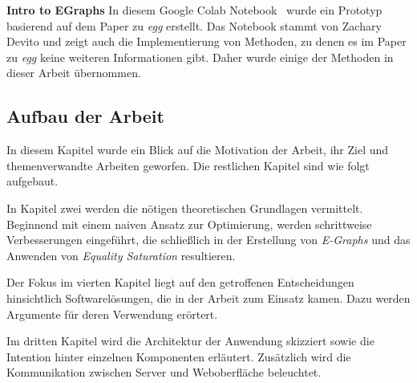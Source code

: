 \noindent\textbf{Intro to EGraphs} In diesem Google Colab Notebook~\cite{devito} wurde ein Prototyp basierend auf dem Paper zu \textit{egg} erstellt.
Das Notebook stammt von Zachary Devito und zeigt auch die Implementierung von Methoden, zu denen es im Paper zu \textit{egg} keine weiteren Informationen gibt. 
Daher wurde einige der Methoden in dieser Arbeit übernommen.

\subsection{Aufbau der Arbeit}

In diesem Kapitel wurde ein Blick auf die Motivation der Arbeit, ihr Ziel und themenverwandte Arbeiten geworfen. Die restlichen Kapitel sind wie folgt aufgebaut.

\vspace{-2mm}

In Kapitel zwei werden die nötigen theoretischen Grundlagen vermittelt. Beginnend mit einem naiven Ansatz zur Optimierung, werden schrittweise Verbesserungen
eingeführt, die schließlich in der Erstellung von \textit{E-Graphs} und das Anwenden von \textit{Equality Saturation} resultieren. 

\vspace{6mm}

\vspace{-2mm}

Der Fokus im vierten Kapitel liegt auf den getroffenen Entscheidungen hinsichtlich Softwarelösungen, die in der Arbeit zum Einsatz kamen. Dazu werden Argumente für deren Verwendung erörtert.

\vspace{6mm}

\vspace{-2mm}

Im dritten Kapitel wird die Architektur der Anwendung skizziert sowie die Intention hinter einzelnen Komponenten erläutert. Zusätzlich wird die Kommunikation zwischen 
Server und Weboberfläche beleuchtet. 

\vspace{6mm}

\vspace{-2mm}

